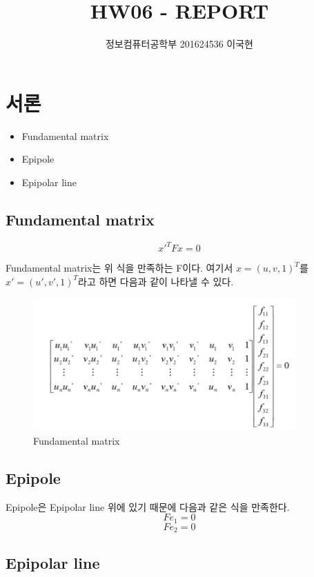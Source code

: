 \documentclass[]{report}
\title{HW06 - REPORT}
\author{정보컴퓨터공학부 201624536 이국현}
\begin{document}
\maketitle


\chapter{서론}
\begin{itemize}
	\item Fundamental matrix
	\item Epipole
	\item Epipolar line
\end{itemize}

\section{Fundamental matrix}

\[ x'^TFx = 0 \]

Fundamental matrix는 위 식을 만족하는 F이다. 여기서 $ x=(u,v,1)^T $를 $ x'=(u',v',1)^T $라고 하면 다음과 같이 나타낼 수 있다. \\

\begin{figure}[ht!]
    \centering
    \includegraphics[width=0.9\textwidth]{image/matrix.png}
    \caption{Fundamental matrix}
    \label{matrix}
\end{figure}



\section{Epipole}

Epipole은 Epipolar line 위에 있기 때문에 다음과 같은 식을 만족한다. \\

\[ Fe_1 = 0 \]
\[ Fe_2 = 0 \]

\section{Epipolar line}
\end{document}
